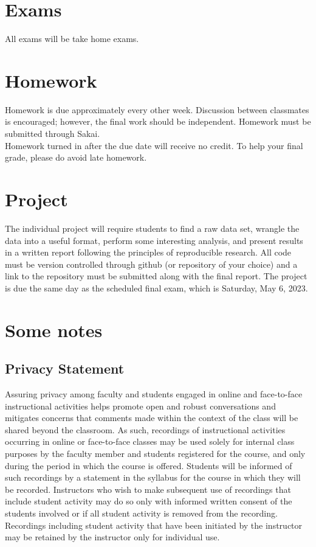 \documentclass{article}\usepackage[]{graphicx}\usepackage[]{color}
\begin{document}
\section*{Exams}
All exams will be take home exams.  

\section*{Homework}
Homework is due approximately every other week. Discussion between classmates is encouraged; however, the final work should be independent.  Homework must be submitted through Sakai.  \\

Homework turned in after the due date will receive no credit.  To help your final grade, please do avoid late homework.\\

\section*{Project}
The individual project will require students to find a raw data set, wrangle the data into a useful format, perform some interesting analysis, and present results in a written report following the principles of reproducible research.  All code must be version controlled through github (or repository of your choice) and a link to the repository must be submitted along with the final report.  The project is due the same day as the scheduled final exam, which is Saturday, May 6, 2023.  \\

\section*{Some notes}
\subsection*{Privacy Statement}
Assuring privacy among faculty and students engaged in online and face-to-face instructional activities helps promote open and robust conversations and mitigates concerns that comments made within the context of the class will be shared beyond the classroom. As such, recordings of instructional activities occurring in online or face-to-face classes may be used solely for internal class purposes by the faculty member and students registered for the course, and only during the period in which the course is offered. Students will be informed of such recordings by a statement in the syllabus for the course in which they will be recorded. Instructors who wish to make subsequent use of recordings that include student activity may do so only with informed written consent of the students involved or if all student activity is removed from the recording. Recordings including student activity that have been initiated by the instructor may be retained by the instructor only for individual use. 
\end{document}
